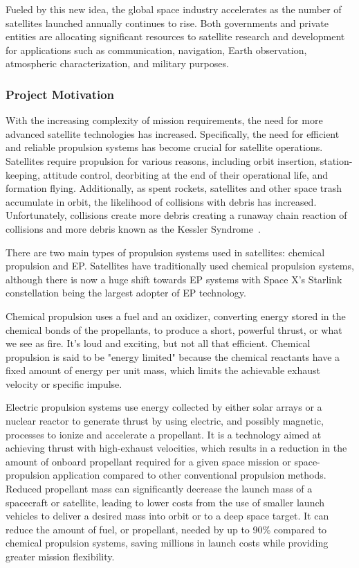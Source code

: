 Fueled by this new idea, the global space industry accelerates as the number of satellites launched annually continues to rise. Both governments and private entities are allocating significant resources to satellite research and development for applications such as communication, navigation, Earth observation, atmospheric characterization, and military purposes.

\subsubsection{Project Motivation}

With the increasing complexity of mission requirements, the need for more advanced satellite technologies has increased. Specifically, the need for efficient and reliable propulsion systems has become crucial for satellite operations. Satellites require propulsion for various reasons, including orbit insertion, station-keeping, attitude control, deorbiting at the end of their operational life, and formation flying. Additionally, as spent rockets, satellites and other space trash accumulate in orbit, the likelihood of collisions with debris has increased. Unfortunately, collisions create more debris creating a runaway chain reaction of collisions and more debris known as the Kessler Syndrome~\cite{nasa-kessler}.

There are two main types of propulsion systems used in satellites: chemical propulsion and \ac{EP}. Satellites have traditionally used chemical propulsion systems, although there is now a huge shift towards \ac{EP} systems with Space X's Starlink constellation being the largest adopter of EP technology.

Chemical propulsion uses a fuel and an oxidizer, converting energy stored in the chemical bonds of the propellants, to produce a short, powerful thrust, or what we see as fire. It’s loud and exciting, but not all that efficient. Chemical propulsion is said to be "energy limited" because the chemical reactants have a fixed amount of energy per unit mass, which limits the achievable exhaust velocity or specific impulse.

Electric propulsion systems use energy collected by either solar arrays or a nuclear reactor to generate thrust by using electric, and possibly magnetic, processes to ionize and accelerate a propellant. It is a technology aimed at achieving thrust with high-exhaust velocities, which results in a reduction in the amount of onboard propellant required for a given space mission or space-propulsion application compared to other conventional propulsion methods. Reduced propellant mass can significantly decrease the launch mass of a spacecraft or satellite, leading to lower costs from the use of smaller launch vehicles to deliver a desired mass into orbit or to a deep space target. \cite{fundamentals-of-electric-propulsion}
It can reduce the amount of fuel, or propellant, needed by up to 90\% compared to chemical propulsion systems, saving millions in launch costs while providing greater mission flexibility. \cite{nasa-electrifying-propulsion}

